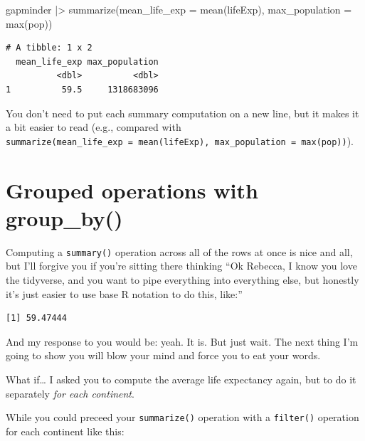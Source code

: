\documentclass[
  letterpaper,
  DIV=11,
  numbers=noendperiod]{scrreprt}
\newenvironment{Shaded}{\begin{snugshade}}{\end{snugshade}}
\newcommand{\AttributeTok}[1]{\textcolor[rgb]{0.40,0.45,0.13}{#1}}
\newcommand{\FunctionTok}[1]{\textcolor[rgb]{0.28,0.35,0.67}{#1}}
\newcommand{\NormalTok}[1]{\textcolor[rgb]{0.00,0.23,0.31}{#1}}
\newcommand{\SpecialCharTok}[1]{\textcolor[rgb]{0.37,0.37,0.37}{#1}}
\begin{document}
\begin{Shaded}
\begin{Highlighting}[]
\NormalTok{gapminder }\SpecialCharTok{|\textgreater{}} 
  \FunctionTok{summarize}\NormalTok{(}\AttributeTok{mean\_life\_exp =} \FunctionTok{mean}\NormalTok{(lifeExp), }
            \AttributeTok{max\_population =} \FunctionTok{max}\NormalTok{(pop))}
\end{Highlighting}
\end{Shaded}

\begin{verbatim}
# A tibble: 1 x 2
  mean_life_exp max_population
          <dbl>          <dbl>
1          59.5     1318683096
\end{verbatim}

You don't need to put each summary computation on a new line, but it
makes it a bit easier to read (e.g., compared with
\texttt{summarize(mean\_life\_exp\ =\ mean(lifeExp),\ max\_population\ =\ max(pop))}).

\section{Grouped operations with
group\_by()}\label{grouped-operations-with-group_by}

Computing a \texttt{summary()} operation across all of the rows at once
is nice and all, but I'll forgive you if you're sitting there thinking
``Ok Rebecca, I know you love the tidyverse, and you want to pipe
everything into everything else, but honestly it's just easier to use
base R notation to do this, like:''

\begin{Shaded}
\end{Shaded}

\begin{verbatim}
[1] 59.47444
\end{verbatim}

And my response to you would be: yeah. It is. But just wait. The next
thing I'm going to show you will blow your mind and force you to eat
your words.

What if\ldots{} I asked you to compute the average life expectancy
again, but to do it separately \emph{for each continent}.

While you could preceed your \texttt{summarize()} operation with a
\texttt{filter()} operation for each continent like this:
\end{document}
